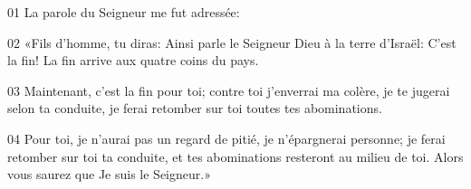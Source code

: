 01 La parole du Seigneur me fut adressée:

02 «Fils d’homme, tu diras: Ainsi parle le Seigneur Dieu à la terre d’Israël: C’est la fin! La fin arrive aux quatre coins du pays.

03 Maintenant, c’est la fin pour toi; contre toi j’enverrai ma colère, je te jugerai selon ta conduite, je ferai retomber sur toi toutes tes abominations.

04 Pour toi, je n’aurai pas un regard de pitié, je n’épargnerai personne; je ferai retomber sur toi ta conduite, et tes abominations resteront au milieu de toi. Alors vous saurez que Je suis le Seigneur.»
